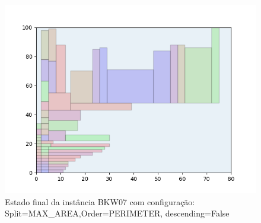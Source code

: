 \begin{figure}[H]
    \centering
    \caption[]{Estado final da instância BKW07 com configuração: Split=MAX_AREA,Order=PERIMETER, descending=False}
    \label{fig:bkw07-max_area-perimeter-false}
    \includegraphics[scale=0.5]{output/figures/bkw/bkw07/max_area/perimeter/false/00}
\end{figure}